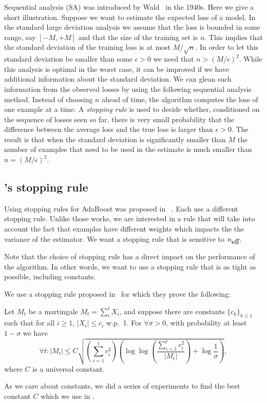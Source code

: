Sequential analysis (SA) was introduced by
Wald~\cite{wald_sequential_1973} in the 1940s.  Here we give a short
illustration. Suppose we want to estimate the expected loss of a
model. In the standard large deviation analysis we assume that the
loss is bounded in some range, say $[-M,+M]$ and that the size of the
training set is $n$. This implies that the standard deviation of the
training loss is at most $M/\sqrt{n}$. In order to let this standard
deviation be smaller than some $\epsilon>0$ we need that $n >
(M/\epsilon)^2$. While this analysis is optimal in the worst case, it
can be improved if we have additional information about the standard
deviation. We can glean such information from the observed losses by
using the following sequential analysis method. Instead of choosing
$n$ ahead of time, the algorithm computes the loss of one example at a
time. A {\em stopping rule} is used to decide whether, conditioned on
the sequence of losses seen so far, there is very small probability
that the difference between the average loss and the true loss is
larger than $\epsilon>0$. The result is that when the standard
deviation is significantly smaller than $M$ the number of examples
that need to be used in the estimate is much smaller than
$n=(M/\epsilon)^2$.

\subsection{\Sparrow's stopping rule} \label{sec:balsubramani}

Using stopping rules for AdaBoost was proposed in
~\cite{domingo_scaling_2000, bradley_filterboost:_2007}. Each use a
different stopping rule. Unlike those works, we are interested in a
rule that will take into account the fact that examples have different
weights which impacts the the variance of the estimator. We want a
stopping rule that is sensitive to ${n_{\mbox{eff}}}$.

Note that the choice of stopping rule has a direct impact on the
performance of the algorithm. In other words, we want to use a
stopping rule that is as tight as possible, including constants.

We use a stopping rule proposed in~\cite{balsubramani_sharp_2014}
for which they prove the following:

\begin{theorem} \label{thm:balsubramani}
  Let $M_t$ be a martingale $M_t = \sum_i^t X_i$,
  and suppose there are constants $\{c_k\}_{k \geq 1}$ such that
  for all $i \geq 1$, $|X_i| \leq c_i$ w.p.\ 1.
  For $\forall \sigma > 0$, with probability at least $1 - \sigma$ we have
  \[
  \forall t: |M_t| \leq C \sqrt{
    \left( \sum_{i=1}^t c_i^2 \right)
    \left( \log \log \left( \frac{ \sum_{i=1}^t c_i^2 }{ |M_t| }\right) +
    \log \frac{1}{\sigma} \right)
  },
  \]
  where $C$ is a universal constant.
\end{theorem}

As we care about constants, we did a series of experiments to find the
best constant $C$ which we use in \Sparrow.
